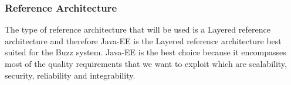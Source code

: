 \subsubsection{Reference Architecture}

The type of reference architecture that will be used is a Layered reference architecture and therefore 
Java-EE is the Layered reference architecture best suited for the Buzz system. Java-EE is the best choice
because it encompasses most of the quality requirements that we want to exploit which are scalability, security,
reliability and integrability.